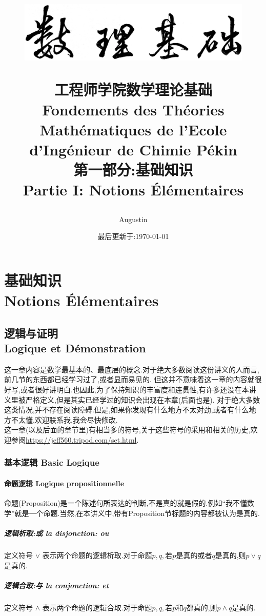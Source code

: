 \documentclass[12pt, a4paper, oneside]{ctexbook}
\title{
\vspace{-2cm}
  \begin{figure}[!t]%
    \centering
    \includegraphics[width=14cm]{shulijichu-2.png}
  \end{figure}
  \vspace{-2cm}
  {\Huge{\textbf{工程师学院数学理论基础\\
Fondements des Théories Mathématiques de l'Ecole d'Ingénieur de Chimie Pékin\\
第一部分:基础知识\\
Partie I: Notions Élémentaires
}}}
}
\author{Augustin}
\date{最后更新于:\today}
\begin{document}
\vspace{-3cm}
\maketitle
\tableofcontents
\else
\part{基础知识\\ Notions Élémentaires}
\fi
\chapter{逻辑与证明\\ Logique et Démonstration}
  这一章内容是数学最基本的、最底层的概念.对于绝大多数阅读这份讲义的人而言,前几节的东西都已经学习过了,或者显而易见的.
  但这并不意味着这一章的内容就很好写,或者很好讲明白.也因此,为了保持知识的丰富度和连贯性,有许多还没在本讲义里被严格定义,但是其实已经学过的知识会出现在本章(后面也是).
  对于绝大多数这类情况,并不存在阅读障碍.但是,如果你发现有什么地方不太对劲,或者有什么地方不太懂,欢迎联系我,我会尽快修改.\\


  这一章(以及后面的章节里)有相当多的符号,关于这些符号的采用和相关的历史,欢迎参阅\url{https://jeff560.tripod.com/set.html}.
  \section{基本逻辑 Basic Logique}
  
  \subsection{命题逻辑 Logique propositionnelle}
  命题(Proposition)是一个陈述句所表达的判断,不是真的就是假的.例如“我不懂数学”就是一个命题.当然,在本讲义中,带有Proposition节标题的内容都被认为是真的.
  \subsubsection{逻辑析取:或  la disjonction: ou}
  定义符号 $\lor $ 表示两个命题的逻辑析取.对于命题$p,q,\text{若}p$是真的或者$q$是真的,则$p\lor q$是真的.
  \subsubsection{逻辑合取:与  la conjonction: et }
  定义符号 $\land  $ 表示两个命题的逻辑合取.对于命题$p,q,\text{若}p$和$q$都真的,则$p\land q$是真的.
\end{document}
